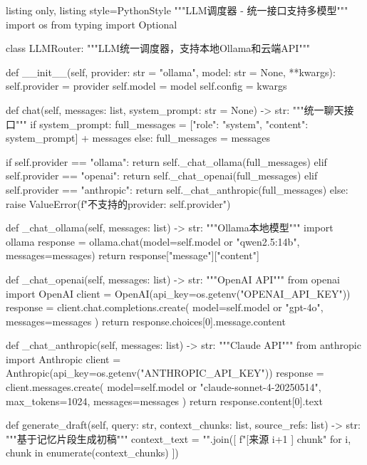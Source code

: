 \documentclass[12pt,a4paper,oneside]{article}
\begin{document}
\begin{tcblisting}{listing only, listing style=PythonStyle}
"""LLM调度器 - 统一接口支持多模型"""
import os
from typing import Optional

class LLMRouter:
    """LLM统一调度器，支持本地Ollama和云端API"""

    def __init__(self, provider: str = "ollama", model: str = None, **kwargs):
        self.provider = provider
        self.model = model
        self.config = kwargs

    def chat(self, messages: list, system_prompt: str = None) -> str:
        """统一聊天接口"""
        if system_prompt:
            full_messages = [{"role": "system", "content": system_prompt}] + messages
        else:
            full_messages = messages

        if self.provider == "ollama":
            return self._chat_ollama(full_messages)
        elif self.provider == "openai":
            return self._chat_openai(full_messages)
        elif self.provider == "anthropic":
            return self._chat_anthropic(full_messages)
        else:
            raise ValueError(f"不支持的provider: {self.provider}")

    def _chat_ollama(self, messages: list) -> str:
        """Ollama本地模型"""
        import ollama
        response = ollama.chat(model=self.model or "qwen2.5:14b", messages=messages)
        return response["message"]["content"]

    def _chat_openai(self, messages: list) -> str:
        """OpenAI API"""
        from openai import OpenAI
        client = OpenAI(api_key=os.getenv("OPENAI_API_KEY"))
        response = client.chat.completions.create(
            model=self.model or "gpt-4o", messages=messages
        )
        return response.choices[0].message.content

    def _chat_anthropic(self, messages: list) -> str:
        """Claude API"""
        from anthropic import Anthropic
        client = Anthropic(api_key=os.getenv("ANTHROPIC_API_KEY"))
        response = client.messages.create(
            model=self.model or "claude-sonnet-4-20250514",
            max_tokens=1024, messages=messages
        )
        return response.content[0].text

    def generate_draft(self, query: str, context_chunks: list, source_refs: list) -> str:
        """基于记忆片段生成初稿"""
        context_text = "\n\n".join([
            f"[来源{ i+1 }] {chunk}"
            for i, chunk in enumerate(context_chunks)
        ])


\end{tcblisting}
\end{document}
